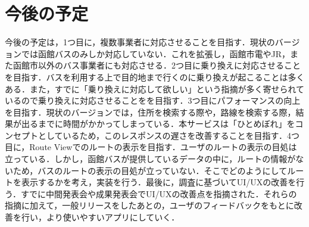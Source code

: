 \chapter{今後の予定}
今後の予定は，1つ目に，複数事業者に対応させることを目指す．現状のバージョンでは函館バスのみしか対応していない．これを拡張し，函館市電やJR，また函館市以外のバス事業者にも対応させる．2つ目に乗り換えに対応させることを目指す．バスを利用する上で目的地まで行くのに乗り換えが起こることは多くある．また，すでに「乗り換えに対応して欲しい」という指摘が多く寄せられているので乗り換えに対応させることをを目指す．3つ目にパフォーマンスの向上を目指す．現状のバージョンでは，住所を検索する際や，路線を検索する際，結果が出るまでに時間がかかってしまっている．本サービスは「ひとめぼれ」をコンセプトとしているため，このレスポンスの遅さを改善することを目指す．4つ目に，Route Viewでのルートの表示を目指す．ユーザのルートの表示の目処は立っている．しかし，函館バスが提供しているデータの中に，ルートの情報がないため，バスのルートの表示の目処が立っていない．そこでどのようにしてルートを表示するかを考え，実装を行う．最後に，調査に基づいてUI/UXの改善を行う．すでに中間発表会や成果発表会でUI/UXの改善点を指摘された．それらの指摘に加えて，一般リリースをしたあとの，ユーザのフィードバックをもとに改善を行い，より使いやすいアプリにしていく．
